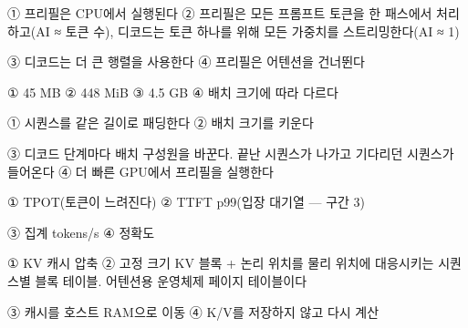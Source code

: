 
\begin{tbboptions}
  \item ① 프리필은 CPU에서 실행된다        ② 프리필은 모든 프롬프트 토큰을 한 패스에서 처리하고(AI ≈ 토큰 수), 디코드는 토큰 하나를 위해 모든 가중치를 스트리밍한다(AI ≈ 1)
  \item ③ 디코드는 더 큰 행렬을 사용한다        ④ 프리필은 어텐션을 건너뛴다
\end{tbboptions}


\begin{tbboptions}
  \item ① 45 MB        ② 448 MiB        ③ 4.5 GB        ④ 배치 크기에 따라 다르다
\end{tbboptions}


\begin{tbboptions}
  \item ① 시퀀스를 같은 길이로 패딩한다        ② 배치 크기를 키운다
  \item ③ 디코드 단계마다 배치 구성원을 바꾼다. 끝난 시퀀스가 나가고 기다리던 시퀀스가 들어온다        ④ 더 빠른 GPU에서 프리필을 실행한다
\end{tbboptions}


\begin{tbboptions}
  \item ① TPOT(토큰이 느려진다)        ② TTFT p99(입장 대기열 — 구간 3)
  \item ③ 집계 tokens/s        ④ 정확도
\end{tbboptions}


\begin{tbboptions}
  \item ① KV 캐시 압축        ② 고정 크기 KV 블록 + 논리 위치를 물리 위치에 대응시키는 시퀀스별 블록 테이블. 어텐션용 운영체제 페이지 테이블이다
  \item ③ 캐시를 호스트 RAM으로 이동        ④ K/V를 저장하지 않고 다시 계산
\end{tbboptions}

